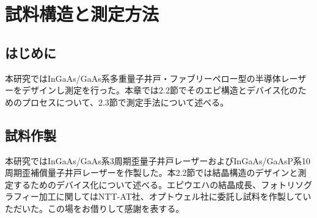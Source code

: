 
\chapter{試料構造と測定方法}%
\section{はじめに}%
本研究ではInGaAs/GaAs系多重量子井戸・ファブリーペロー型の半導体レーザーをデザインし測定を行った。本章では2.2節でそのエピ構造とデバイス化のためのプロセスについて、2.3節で測定手法について述べる。
\section{試料作製}%
本研究ではInGaAs/GaAs系3周期歪量子井戸レーザーおよびInGaAs/GaAsP系10周期歪補償量子井戸レーザーを作製した。本2.2節では結晶構造のデザインと測定するためのデバイス化について述べる。エピウエハの結晶成長、フォトリソグラフィー加工に関してはNTT-AT社、オプトウェル社に委託し試料を作製していただいた。この場をお借りして感謝を表する。

